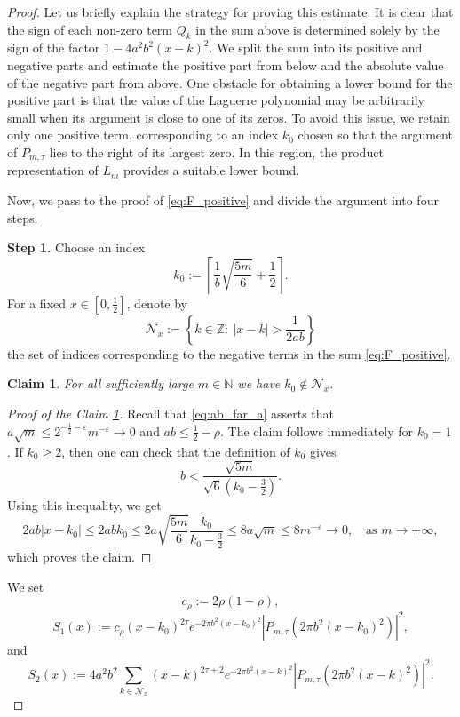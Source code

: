 \documentclass[11pt]{amsart}
\numberwithin{equation}{section}
\newtheorem{claim}[theorem]{Claim}
\newcommand{\Z}{{\mathbb Z}}
\newcommand{\N}{{\mathbb N}}
\begin{document}
\begin{proof}
Let us briefly explain the strategy for proving this estimate.
It is clear that the sign of each non-zero term $Q_k$ in the sum above is determined solely by the sign of the factor
$1-4a^2b^2(x-k)^2.$
We split the sum into its positive and negative parts and estimate the positive part from below and the absolute value of the negative part from above.
One obstacle for obtaining a lower bound for the positive part is that the value of the Laguerre polynomial may be arbitrarily small when its argument is close to one of its zeros. To avoid this issue, we retain only one positive term, corresponding to an index $k_0$ chosen so that the argument of $P_{m,\tau}$ lies to the right of its largest zero. In this region, the product representation of $L_m$ provides a suitable lower bound.

Now, we pass to the proof of \eqref{eq:F_positive} and divide the argument into four steps.

\textbf{Step 1.}
Choose an index
\begin{equation}\label{eq:k_0_choice}
    k_0:=
    \left\lceil
        \frac{1}{b}\sqrt{\frac{5m}{6}}+\frac{1}{2}
    \right\rceil. 
\end{equation}
For a fixed $x\in[0,\frac{1}{2}]$, denote by
$$
\mathcal{N}_x:=\left\{k\in\Z:\ |x-k|>\frac{1}{2ab}\right\}
$$
the set of indices corresponding to the negative terms in the sum \eqref{eq:F_positive}.
\begin{claim}\label{claim:k_0_N_X}
   For all sufficiently large $m\in \N$ we have $k_0\notin \mathcal{N}_x$. 
\end{claim}
\begin{proof}[Proof of the Claim \ref{claim:k_0_N_X}]
Recall that \eqref{eq:ab_far_a} asserts that $a \sqrt{m} \leq 2^{-\frac{1}{2}-\varepsilon} m^{-\varepsilon} \to 0$ and $ab\leq \frac{1}{2}-\rho$. 
The claim follows immediately for $k_0=1$. If $k_0\geq2$, then one can check that the definition of $k_0$ gives
$$
b<\frac{\sqrt{5m}}{\sqrt{6}(k_0-\frac{3}{2})}.
$$
Using this inequality, we get
\begin{equation}\label{eq:2abk_0}
2ab|x-k_0|
\leq 2ab k_0 \leq
2 a\sqrt{\frac{5m}{6}} \frac{k_0}{k_0-\frac{3}{2}} \leq 8 a\sqrt{m} \leq 8 m^{-\varepsilon} \to 0, \quad \text{as } m \to +\infty,
\end{equation}
which proves the claim.
\end{proof}

We set
\begin{equation}\label{eq:c_rho}
    c_{\rho}:=2\rho(1-\rho),
\end{equation}
\begin{equation}\label{eq:S_1_def}
    S_1(x):=c_{\rho} (x-k_0)^{2\tau} e^{-2\pi b^2(x-k_0)^2}
\left|P_{m,\tau}\left(2\pi b^2(x-k_0)^2\right)\right|^2,
\end{equation}
and
\begin{equation}
    S_2(x):= 4a^2b^2 \sum_{k\in\mathcal{N}_x}  (x-k)^{2\tau+2}e^{-2\pi b^2(x-k)^2} \left|P_{m, \tau}\left(2\pi b^2(x-k)^2\right)\right|^2.
\end{equation}


\end{proof}
\end{document}
